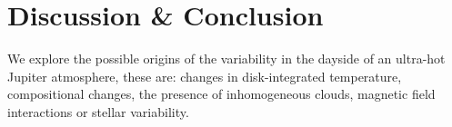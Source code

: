 \section{Discussion \& Conclusion}



We explore the possible origins of the variability in the dayside of an ultra-hot Jupiter atmosphere, these are: changes in disk-integrated temperature, compositional changes, the presence of inhomogeneous clouds, magnetic field interactions or stellar variability.

